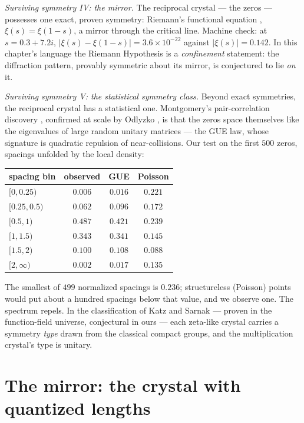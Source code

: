 \documentclass[11pt]{article}
\theoremstyle{remark}
\begin{document}
\emph{Surviving symmetry IV: the mirror.} The reciprocal crystal --- the zeros --- possesses one
exact, proven symmetry: Riemann's functional equation \cite{Riemann}, $\xi(s) = \xi(1-s)$, a mirror
through the critical line. Machine check: at $s = 0.3 + 7.2i$,
$|\xi(s) - \xi(1-s)| = 3.6 \times 10^{-22}$ against $|\xi(s)| = 0.142$. In this chapter's language
the Riemann Hypothesis is a \emph{confinement} statement: the diffraction pattern, provably symmetric
about its mirror, is conjectured to lie \emph{on} it.

\emph{Surviving symmetry V: the statistical symmetry class.} Beyond exact symmetries, the reciprocal
crystal has a statistical one. Montgomery's pair-correlation discovery \cite{Montgomery}, confirmed
at scale by Odlyzko \cite{Odlyzko}, is that the zeros space themselves like the eigenvalues of large
random unitary matrices --- the GUE law, whose signature is quadratic repulsion of near-collisions.
Our test on the first $500$ zeros, spacings unfolded by the local density:

\begin{center}
\begin{tabular}{lccc}
\hline
spacing bin & observed & GUE & Poisson \\
\hline
$[0, 0.25)$ & $0.006$ & $0.016$ & $0.221$ \\
$[0.25, 0.5)$ & $0.062$ & $0.096$ & $0.172$ \\
$[0.5, 1)$ & $0.487$ & $0.421$ & $0.239$ \\
$[1, 1.5)$ & $0.343$ & $0.341$ & $0.145$ \\
$[1.5, 2)$ & $0.100$ & $0.108$ & $0.088$ \\
$[2, \infty)$ & $0.002$ & $0.017$ & $0.135$ \\
\hline
\end{tabular}
\end{center}

\noindent The smallest of $499$ normalized spacings is $0.236$; structureless (Poisson) points would
put about a hundred spacings below that value, and we observe one. The spectrum repels. In the
classification of Katz and Sarnak \cite{KatzSarnak} --- proven in the function-field universe,
conjectural in ours --- each zeta-like crystal carries a symmetry \emph{type} drawn from the
classical compact groups, and the multiplication crystal's type is unitary.

\section{The mirror: the crystal with quantized lengths}
\end{document}
